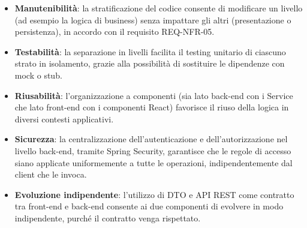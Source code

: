 \begin{itemize}[leftmargin=1.1em]
\item \textbf{Manutenibilità}: la stratificazione del codice consente di modificare un livello (ad esempio la logica di business) senza impattare gli altri (presentazione o persistenza), in accordo con il requisito REQ-NFR-05.

\item \textbf{Testabilità}: la separazione in livelli facilita il testing unitario di ciascuno strato in isolamento, grazie alla possibilità di sostituire le dipendenze con mock o stub.

\item \textbf{Riusabilità}: l'organizzazione a componenti (sia lato back-end con i Service che lato front-end con i componenti React) favorisce il riuso della logica in diversi contesti applicativi.

\item \textbf{Sicurezza}: la centralizzazione dell'autenticazione e dell'autorizzazione nel livello back-end, tramite Spring Security, garantisce che le regole di accesso siano applicate uniformemente a tutte le operazioni, indipendentemente dal client che le invoca.

\item \textbf{Evoluzione indipendente}: l'utilizzo di DTO e API REST come contratto tra front-end e back-end consente ai due componenti di evolvere in modo indipendente, purché il contratto venga rispettato.
\end{itemize}
